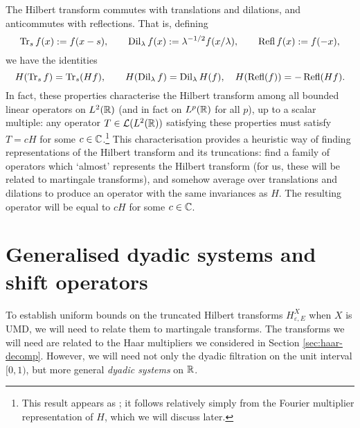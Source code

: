 The Hilbert transform commutes with translations and dilations, and anticommutes with reflections.
That is, defining
\begin{equation}\label{eq:symmetries}
  \operatorname{Tr}_{s} f (x) := f(x - s), \qquad \operatorname{Dil}_{\lambda} f(x) := \lambda^{-1/2}f(x/\lambda), \qquad   \operatorname{Refl} f(x) := f(-x),
\end{equation}
we have the identities
\begin{equation*}
  H(\operatorname{Tr}_{s} f) = \operatorname{Tr}_{s} (Hf), \qquad H(\operatorname{Dil}_{\lambda} f) = \operatorname{Dil}_{\lambda} H(f), \quad H(\operatorname{Refl}(f)) = -\operatorname{Refl}(Hf).
\end{equation*}
In fact, these properties characterise the Hilbert transform among all bounded linear operators on $L^2(\mathbb{R})$ (and in fact on $L^p(\mathbb{R})$ for all $p$), up to a scalar multiple: any operator $T \in \mathcal{L}(L^2(\mathbb{R}))$ satisfying these properties must satisfy $T = cH$ for some $c \in \mathbb{C}$.\footnote{This result appears as \cite[Exercise 5.1.11]{grafakos}; it follows relatively simply from the Fourier multiplier representation of $H$, which we will discuss later.}
This characterisation provides a heuristic way of finding representations of the Hilbert transform and its truncations: find a family of operators which `almost' represents the Hilbert transform (for us, these will be related to martingale transforms), and somehow average over translations and dilations to produce an operator with the same invariances as $H$.
The resulting operator will be equal to $cH$ for some $c \in \mathbb{C}$.

\section{Generalised dyadic systems and shift operators}

To establish uniform bounds on the truncated Hilbert transforms $H_{\varepsilon, E}^{X}$ when $X$ is UMD, we will need to relate them to martingale transforms.
The transforms we will need are related to the Haar multipliers we considered in Section \ref{sec:haar-decomp}.
However, we will need not only the dyadic filtration on the unit interval $[0,1)$, but more general \emph{dyadic systems} on $\mathbb{R}$.

